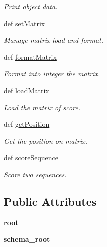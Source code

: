 \begin{DoxyCompactItemize}
\begin{DoxyCompactList}\small\item\em \-Print object data. \end{DoxyCompactList}\item 
def \hyperlink{classiRNA__pred_1_1Interaction_1_1Interaction_af62ad9d36d250a58dcd6d7e175fe094a}{set\-Matrix}
\begin{DoxyCompactList}\small\item\em \-Manage matrix load and format. \end{DoxyCompactList}\item 
def \hyperlink{classiRNA__pred_1_1Interaction_1_1Interaction_a1c7a38ca00389e2e4c7bc69cb1c1458c}{format\-Matrix}
\begin{DoxyCompactList}\small\item\em \-Format into integer the matrix. \end{DoxyCompactList}\item 
def \hyperlink{classiRNA__pred_1_1Interaction_1_1Interaction_a53ef0c21712a28c85055a205301b3cae}{load\-Matrix}
\begin{DoxyCompactList}\small\item\em \-Load the matrix of score. \end{DoxyCompactList}\item 
def \hyperlink{classiRNA__pred_1_1Interaction_1_1Interaction_a671b45c3dc89e7b9d30e29849b8238b7}{get\-Position}
\begin{DoxyCompactList}\small\item\em \-Get the position on matrix. \end{DoxyCompactList}\item 
def \hyperlink{classiRNA__pred_1_1Interaction_1_1Interaction_ad0c1d53e168ad4dcce5f6583af945eae}{score\-Sequence}
\begin{DoxyCompactList}\small\item\em \-Score two sequences. \end{DoxyCompactList}\end{DoxyCompactItemize}
\subsection*{\-Public \-Attributes}
\begin{DoxyCompactItemize}
\item 
\hypertarget{classiRNA__pred_1_1Interaction_1_1Interaction_a52352c9fca3cf47298711255ceabda32}{
{\bfseries root}}
\label{classiRNA__pred_1_1Interaction_1_1Interaction_a52352c9fca3cf47298711255ceabda32}

\item 
\hypertarget{classiRNA__pred_1_1Interaction_1_1Interaction_ad1c238c3fa3cedcd2e8ecac3894b8e9c}{
{\bfseries schema\-\_\-root}}
\label{classiRNA__pred_1_1Interaction_1_1Interaction_ad1c238c3fa3cedcd2e8ecac3894b8e9c}

\end{DoxyCompactItemize}
